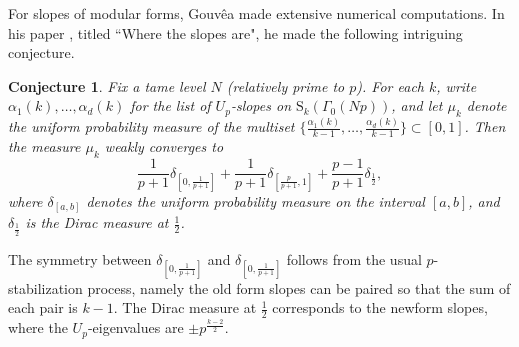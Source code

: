 \documentclass[12pt]{amsart}
\newtheorem{conjecture}[subsection]{Conjecture}
\theoremstyle{definition}
\numberwithin{equation}{subsection}
\def\rmS{\mathrm{S}}
\begin{document}
For slopes of modular forms, Gouv\^ea made extensive numerical computations. In his paper \cite{gouvea}, titled ``Where the slopes are",  he made the following intriguing conjecture.
\begin{conjecture}
Fix a tame level $N$ (relatively prime to $p$). For each $k$, write $\alpha_1(k), \dots, \alpha_d(k)$ for the list of $U_p$-slopes on $\rmS_k(\Gamma_0(Np))$, and let $\mu_k$ denote the uniform probability measure of the multiset $\{\frac{\alpha_1(k)}{k-1},\dots, \frac{\alpha_d(k)}{k-1}\} \subset [0,1]$. Then the measure $\mu_k$ weakly converges to 
\begin{equation}
\label{E:gouvea measure}
\frac{1}{p+1}\delta_{[0, \frac 1{p+1}]} + \frac{1}{p+1}\delta_{[ \frac p{p+1}, 1]} + \frac{p-1}{p+1}\delta_{\frac 12},
\end{equation}
where $\delta_{[a,b]}$ denotes the uniform probability measure on the interval $[a,b]$, and $\delta_{\frac 12}$ is the Dirac measure at $\frac 12$.
\end{conjecture}
The symmetry between $\delta_{[0, \frac 1{p+1}]}$ and $\delta_{[0, \frac 1{p+1}]}$ follows from the usual $p$-stabilization process, namely the old form slopes can be paired so that the sum of each pair is $k-1$. The Dirac measure at $\frac 12$ corresponds to the newform slopes, where the $U_p$-eigenvalues are $\pm p^{\frac{k-2}2}$.
\end{document}
